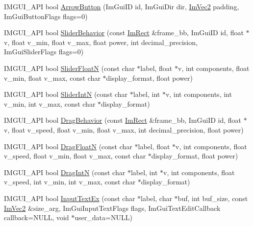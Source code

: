 \begin{DoxyCompactItemize}
\item 
I\+M\+G\+U\+I\+\_\+\+A\+PI bool \hyperlink{namespace_im_gui_ac7c2bd67d2bb2d8ee4b583b1576a0bd3}{Arrow\+Button} (Im\+Gui\+ID id, Im\+Gui\+Dir dir, \hyperlink{struct_im_vec2}{Im\+Vec2} padding, Im\+Gui\+Button\+Flags flags=0)
\item 
I\+M\+G\+U\+I\+\_\+\+A\+PI bool \hyperlink{namespace_im_gui_a3d3b2964eeba76dadaa532232c23fc97}{Slider\+Behavior} (const \hyperlink{struct_im_rect}{Im\+Rect} \&frame\+\_\+bb, Im\+Gui\+ID id, float $\ast$v, float v\+\_\+min, float v\+\_\+max, float power, int decimal\+\_\+precision, Im\+Gui\+Slider\+Flags flags=0)
\item 
I\+M\+G\+U\+I\+\_\+\+A\+PI bool \hyperlink{namespace_im_gui_a3ffffbdfe59f18a2321dd1cb39dfb6e1}{Slider\+FloatN} (const char $\ast$label, float $\ast$v, int components, float v\+\_\+min, float v\+\_\+max, const char $\ast$display\+\_\+format, float power)
\item 
I\+M\+G\+U\+I\+\_\+\+A\+PI bool \hyperlink{namespace_im_gui_a13fe35db80c7d1002c98fd5e8ea90239}{Slider\+IntN} (const char $\ast$label, int $\ast$v, int components, int v\+\_\+min, int v\+\_\+max, const char $\ast$display\+\_\+format)
\item 
I\+M\+G\+U\+I\+\_\+\+A\+PI bool \hyperlink{namespace_im_gui_a4fdcba60dbe3762a144051add234ea48}{Drag\+Behavior} (const \hyperlink{struct_im_rect}{Im\+Rect} \&frame\+\_\+bb, Im\+Gui\+ID id, float $\ast$v, float v\+\_\+speed, float v\+\_\+min, float v\+\_\+max, int decimal\+\_\+precision, float power)
\item 
I\+M\+G\+U\+I\+\_\+\+A\+PI bool \hyperlink{namespace_im_gui_a2a2764b6f0b3291ad0df4d99127dd751}{Drag\+FloatN} (const char $\ast$label, float $\ast$v, int components, float v\+\_\+speed, float v\+\_\+min, float v\+\_\+max, const char $\ast$display\+\_\+format, float power)
\item 
I\+M\+G\+U\+I\+\_\+\+A\+PI bool \hyperlink{namespace_im_gui_a2854d672b818938e6e9fb1de6de3dbe7}{Drag\+IntN} (const char $\ast$label, int $\ast$v, int components, float v\+\_\+speed, int v\+\_\+min, int v\+\_\+max, const char $\ast$display\+\_\+format)
\item 
I\+M\+G\+U\+I\+\_\+\+A\+PI bool \hyperlink{namespace_im_gui_a4a62260abe773d4e193db94cdfdc41bf}{Input\+Text\+Ex} (const char $\ast$label, char $\ast$buf, int buf\+\_\+size, const \hyperlink{struct_im_vec2}{Im\+Vec2} \&size\+\_\+arg, Im\+Gui\+Input\+Text\+Flags flags, Im\+Gui\+Text\+Edit\+Callback callback=N\+U\+LL, void $\ast$user\+\_\+data=N\+U\+LL)
\item 

\end{DoxyCompactItemize}
